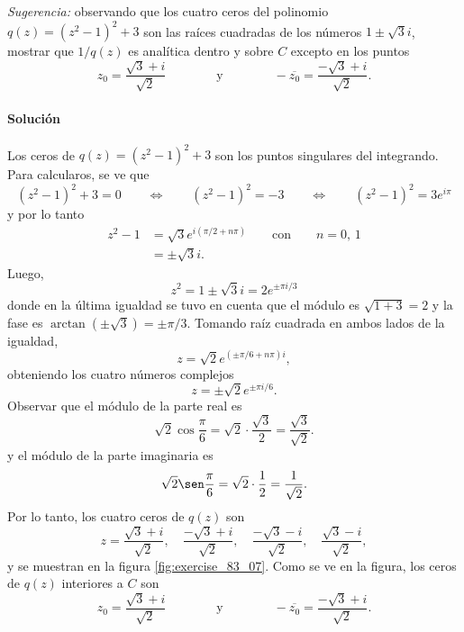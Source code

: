 \documentclass[a4paper]{report}
\begin{document}
\emph{Sugerencia:} observando que los cuatro ceros del polinomio \(q(z)=(z^2-1)^2+3\) son las raíces cuadradas de los números \(1\pm\sqrt{3}i\), mostrar que \(1/q(z)\) es analítica dentro y sobre \(C\) excepto en los puntos
\[
 z_0=\frac{\sqrt{3}+i}{\sqrt{2}}
 \qquad\qquad\textrm{y}\qquad\qquad
 -\overline{z_0}=\frac{-\sqrt{3}+i}{\sqrt{2}}.
\]

\paragraph{Solución}

Los ceros de \(q(z)=(z^2-1)^2+3\) son los puntos singulares del integrando. Para calcularos, se ve que 
\[
 (z^2-1)^2+3=0
 \qquad\Leftrightarrow\qquad 
 (z^2-1)^2=-3
 \qquad\Leftrightarrow\qquad
 (z^2-1)^2=3e^{i\pi}
\]
y por lo tanto
\begin{align*}
 z^2-1&=\sqrt{3}e^{i(\pi/2+n\pi)}\qquad\textrm{con}\qquad n=0,\,1 \\
  &=\pm\sqrt{3}i.
\end{align*}
Luego,
\[
 z^2=1\pm\sqrt{3}i=2e^{\pm\pi i/3}
\]
donde en la última igualdad se tuvo en cuenta que el módulo es \(\sqrt{1+3}=2\) y la fase es \(\arctan(\pm\sqrt{3})=\pm\pi/3\). Tomando raíz cuadrada en ambos lados de la igualdad,
\[
 z=\sqrt{2}e^{(\pm\pi/6+n\pi)i},
\]
obteniendo los cuatro números complejos
\[
 z=\pm\sqrt{2}e^{\pm\pi i/6}. 
\]
Observar que el módulo de la parte real es
\[
 \sqrt{2}\cos\frac{\pi}{6}=\sqrt{2}\cdot\frac{\sqrt{3}}{2}=\frac{\sqrt{3}}{\sqrt{2}}.
\]
y el módulo de la parte imaginaria es 
\[
 \sqrt{2}\sen\frac{\pi}{6}=\sqrt{2}\cdot\frac{1}{2}=\frac{1}{\sqrt{2}}.
\]
Por lo tanto, los cuatro ceros de \(q(z)\) son 
\[
 z=\frac{\sqrt{3}+i}{\sqrt{2}},\quad\frac{-\sqrt{3}+i}{\sqrt{2}},\quad\frac{-\sqrt{3}-i}{\sqrt{2}},\quad\frac{\sqrt{3}-i}{\sqrt{2}},
\]
y se muestran en la figura \ref{fig:exercise_83_07}. Como se ve en la figura, los ceros de \(q(z)\) interiores a \(C\) son
\[
 z_0=\frac{\sqrt{3}+i}{\sqrt{2}}\qquad\qquad\textrm{y}\qquad\qquad -\overline{z_0}=\frac{-\sqrt{3}+i}{\sqrt{2}}.
\]
\end{document}
